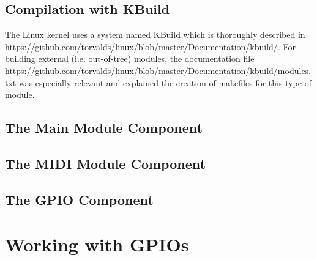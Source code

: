 \documentclass[paper=a4,fontsize=11pt,twocolumn,pagesize,bibtotoc]{scrartcl}
\begin{document}
\subsection{Compilation with KBuild}
\label{component:compilation}

The Linux kernel uses a system named KBuild which is thoroughly described in 
\url{https://github.com/torvalds/linux/blob/master/Documentation/kbuild/}.
For building external (i.e. out-of-tree) modules, the documentation file
\url{https://github.com/torvalds/linux/blob/master/Documentation/kbuild/modules.txt}
was especially relevant and explained the creation of makefiles for this type
of module.



\subsection{The Main Module Component}
\label{component:main}

\subsection{The MIDI Module Component}
\label{component:midi}

\subsection{The GPIO Component}
\label{component:gpio}

\section{Working with GPIOs}
\label{michael:gpios}
\end{document}
